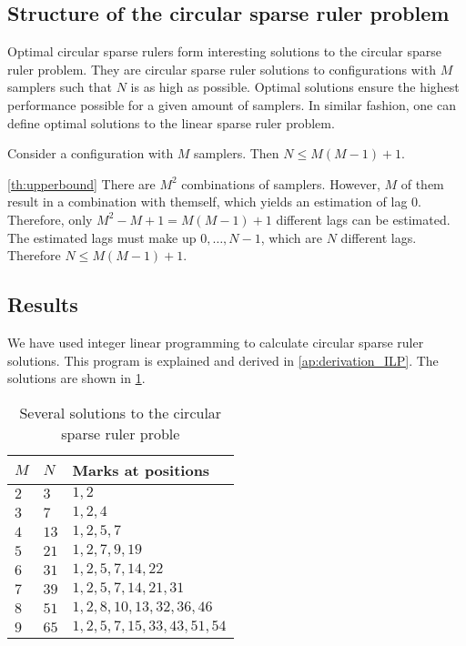 \documentclass[a4paper, openany, oneside]{memoir}
\begin{document}
\subsection{Structure of the circular sparse ruler problem}
Optimal circular sparse rulers form interesting solutions to the circular sparse ruler problem. They are circular sparse ruler solutions to configurations with $M$ samplers such that $N$ is as high as possible. Optimal solutions ensure the highest performance possible for a given amount of samplers. In similar fashion, one can define optimal solutions to the linear sparse ruler problem. 

\begin{blockTheorem}\label{th:upperbound}
Consider a configuration with $M$ samplers. Then $N \le M(M-1)+1$.
\end{blockTheorem}

\begin{blockProofTheorem}{\ref{th:upperbound}}
    There are $M^2$ combinations of samplers. However, $M$ of them result in a combination with themself, which yields an estimation of lag $0$. Therefore, only $M^2-M+1=M(M-1)+1$ different lags can be estimated. The estimated lags must make up $0,\ldots,N-1$, which are $N$ different lags. Therefore $N \le M(M-1)+1$.
\end{blockProofTheorem}

\subsection{Results}
We have used integer linear programming to calculate circular sparse ruler solutions. This program is explained and derived in \cref{ap:derivation_ILP}. The solutions are shown in \cref{tab:circ-sols}.
\begin{table}
    \centering
    \begin{tabular}{lll}
        $M$ & $N$ & \textbf{Marks at positions} \\ \hline
        $2$ & $3$ & $1,2$ \\
        $3$ & $7$ & $1,2,4$ \\
        $4$ & $13$ & $1,2,5,7$ \\
        $5$ & $21$ & $1,2,7,9, 19$ \\
        $6$ & $31$ & $1,2,5,7,14,22$ \\
        $7$ & $39$ & $1,2,5,7,14,21,31$ \\
        $8$ & $51$ & $1,2,8,10,13,32,36, 46$ \\
        $9$ & $65$ & $1,2,5,7,15, 33, 43, 51, 54$ \\
    \end{tabular}
    \caption{Several solutions to the circular sparse ruler proble}
    \label{tab:circ-sols}
\end{table}
\end{document}

